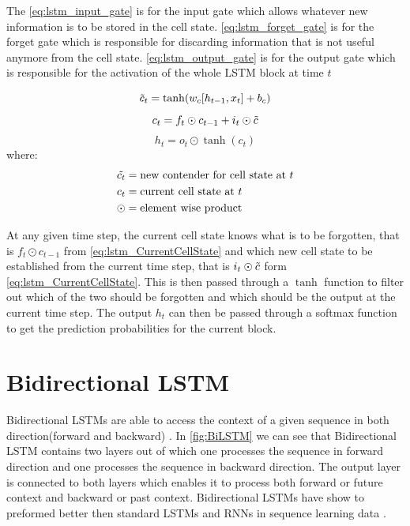 The \ref{eq:lstm_input_gate} is for the input gate which allows whatever new information is to be stored in the cell state. \ref{eq:lstm_forget_gate} is for the forget gate which is responsible for discarding information that is not useful anymore from the cell state. \ref{eq:lstm_output_gate} is for the output gate which is responsible for the activation of the whole LSTM block at time $t$ 


\begin{equation}\label{eq:lstm_newCellState}
    \Tilde{c}_{t} =\tanh(w_{c}[h_{t-1},x_{t}]+b_{c})
\end{equation}
\begin{equation} \label{eq:lstm_CurrentCellState}
    c_{t} = f_{t} \odot c_{t-1} + i_{t} \odot \Tilde{c}
\end{equation}
\begin{equation}\label{eq:lstm_output}
    h_{t} = o_{t} \odot \tanh(c_{t})
\end{equation}
where:
\begin{align*}
      & \Tilde{c_{t}}=\text{new contender for cell state at $t$}\\
      & c_{t}=\text{current cell state at $t$}\\
      & \odot=\text{element wise product}
\end{align*}


At any given time step, the current cell state knows what is to be forgotten, that is $f_{t}\odot c_{t-1}$ from \ref{eq:lstm_CurrentCellState} and which new cell state to be established from the current time step, that is $i_{t}\odot \Tilde{c}$ form \ref{eq:lstm_CurrentCellState}. This is then passed through a $\tanh$ function to filter out which of the two should be forgotten and which should be the output at the current time step. The output $h_{t}$ can then be passed through a softmax function to get the prediction probabilities for the current block.




\section{Bidirectional LSTM}
Bidirectional LSTMs are  able to access the context of a given sequence in both direction(forward and backward) \cite{schuster1997bidirectional}. In \ref{fig:BiLSTM} we can see that Bidirectional LSTM contains two layers out of which one processes the sequence in forward direction and one processes the sequence in backward direction. The output layer is connected to both layers which enables it to process both forward or future context and backward or past context. Bidirectional LSTMs have show to preformed better then standard LSTMs and RNNs in sequence learning data \cite{baldi2000bidirectional} \cite{fukada1999phoneme}.

